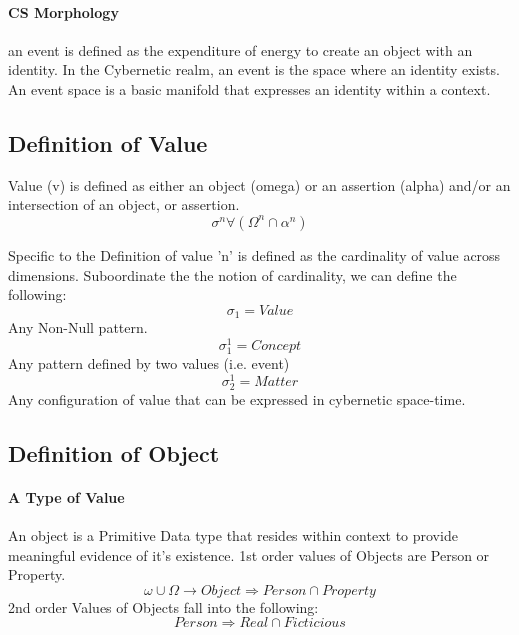 \documentclass{article}
\begin{document}
		\paragraph{CS Morphology} an event is defined as the expenditure of energy to create an object with an identity. In the Cybernetic realm, an event is the space where an identity exists.  An event space is a basic manifold that expresses an identity within a context.
			
	\subsection{Definition of Value}
			Value (v) is defined as either an object (omega) or an assertion (alpha) and/or an intersection of an object, or assertion.
			\begin{equation}
			\sigma^n \forall (\Omega^n \cap \alpha ^n) 
			\end{equation}


 Specific to the Definition of value 'n' is defined as the cardinality of value across dimensions.  Suboordinate the the notion of cardinality, we can define the following:
		\begin{equation}
			\sigma_1 = Value
		\end{equation}
			Any Non-Null pattern.
		\begin{equation}
			\sigma^1_1 = Concept
		\end{equation}
			Any pattern defined by two values (i.e. event)
		\begin{equation}
			\sigma^1_2 = Matter
		\end{equation}
			Any configuration of value that can be expressed in cybernetic space-time.
\subsection{Definition of Object}
	\paragraph{A Type of Value}
		An object is a Primitive Data type that resides within context to provide meaningful evidence of it's existence.
		1st order values of Objects are Person or Property.
			\begin{equation}
				\omega \cup \Omega \rightarrow Object \Rightarrow Person \cap Property
			\end{equation}
		2nd order Values of Objects fall into the following:
			\begin{equation}
				Person \Rightarrow Real \cap Ficticious
			\end{equation}
			
\end{document}
